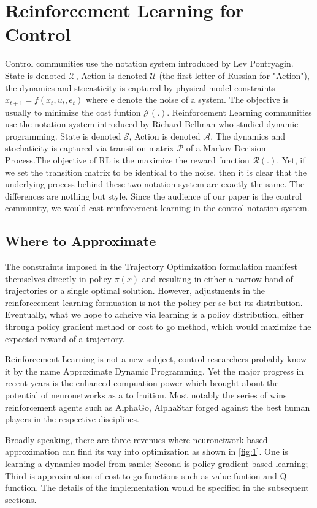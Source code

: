 \documentclass[journal]{IEEEtran}
\begin{document}
\section{Reinforcement Learning for Control}
Control communities use the notation system introduced by Lev Pontryagin. State is denoted $ \mathcal{X}$, Action is denoted $\mathcal{U}$ (the first letter of Russian for "Action"), the dynamics and stocasticity is captured by physical model constraints $x_{t+1}=f(x_t,u_t,e_t)$ where e denote the noise of a system. The objective is usually to minimize the cost funtion $\mathcal{J(.)}$. Reinforcement Learning communities use the notation system introduced by Richard Bellman who studied dynamic programming. State is denoted $\mathcal{S}$, Action is denoted $\mathcal{A}$. The dynamics and stochaticity is captured via transition matrix $\mathcal{P}$ of a Markov Decision Process.The objective of RL is the maximize the reward function $\mathcal{R(.)}$. Yet, if we set the transition matrix to be identical to the noise, then it is clear that the underlying process behind these two notation system are exactly the same. The differences are nothing but style. Since the audience of our paper is the control community, we would cast reinforcement learning in the control notation system.

\subsection{Where to Approximate}
The constraints imposed in the Trajectory Optimization formulation manifest themselves directly in policy $\pi(x)$ and resulting in either a narrow band of trajectories or a single optimal solution. However, adjustments in the reinforecement learning formuation is not the policy per se but its distribution. Eventually, what we hope to acheive via learning is a policy distribution, either through policy gradient method or cost to go method, which would maximize the expected reward of a trajectory.

Reinforcement Learning is not a new subject, control researchers probably know it by the name Approximate Dynamic Programming. Yet the major progress in recent years is the enhanced compuation power which brought about the potential of neuronetworks as a to fruition. Most notably the series of wins reinforcement agents such as AlphaGo, AlphaStar forged against the best human players in the respective disciplines.

Broadly speaking, there are three revenues where neuronetwork based approximation can find its way into optimization as shown in \ref{fig:1}. One is learning a dynamics model from samle; Second is policy gradient based learning; Third is approximation of cost to go functions such as value funtion and Q function. The details of the implementation would be specified in the subsequent sections.
\end{document}
